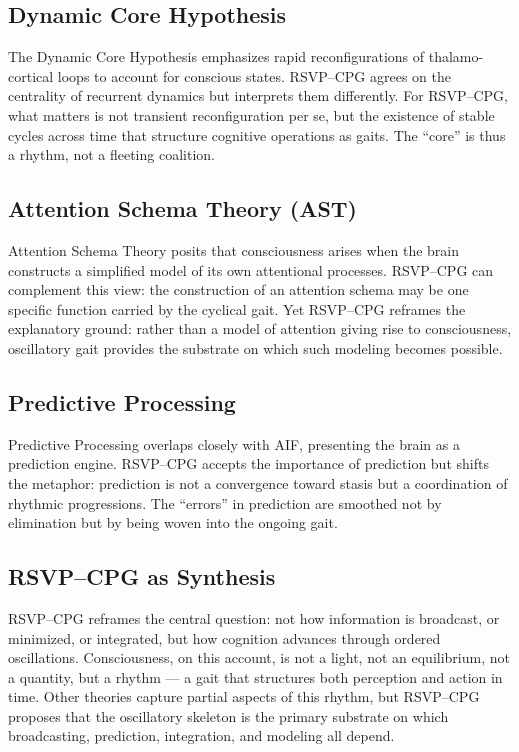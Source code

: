 \documentclass{article}
\begin{document}
\subsection{Dynamic Core Hypothesis}
The Dynamic Core Hypothesis emphasizes rapid reconfigurations of thalamo-cortical 
loops to account for conscious states. RSVP--CPG agrees on the centrality of 
recurrent dynamics but interprets them differently. For RSVP--CPG, what matters 
is not transient reconfiguration per se, but the existence of stable cycles across 
time that structure cognitive operations as gaits. The ``core'' is thus a rhythm, 
not a fleeting coalition.  

\subsection{Attention Schema Theory (AST)}
Attention Schema Theory posits that consciousness arises when the brain constructs 
a simplified model of its own attentional processes. RSVP--CPG can complement this view: 
the construction of an attention schema may be one specific function carried by the 
cyclical gait. Yet RSVP--CPG reframes the explanatory ground: rather than a model 
of attention giving rise to consciousness, oscillatory gait provides the substrate 
on which such modeling becomes possible.  

\subsection{Predictive Processing}
Predictive Processing overlaps closely with AIF, presenting the brain as a prediction 
engine. RSVP--CPG accepts the importance of prediction but shifts the metaphor: 
prediction is not a convergence toward stasis but a coordination of rhythmic progressions. 
The ``errors'' in prediction are smoothed not by elimination but by being woven into 
the ongoing gait.  

\subsection{RSVP--CPG as Synthesis}
RSVP--CPG reframes the central question: not how information is broadcast, 
or minimized, or integrated, but how cognition advances through ordered oscillations.  
Consciousness, on this account, is not a light, not an equilibrium, not a quantity, 
but a rhythm --- a gait that structures both perception and action in time.  
Other theories capture partial aspects of this rhythm, but RSVP--CPG proposes 
that the oscillatory skeleton is the primary substrate on which broadcasting, 
prediction, integration, and modeling all depend.  
\end{document}

